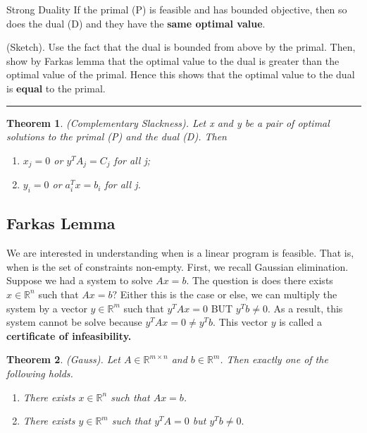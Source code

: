 \documentclass[twoside]{article}
\newcounter{lecnum}
\newtheorem{theorem}{Theorem}[lecnum]
\newenvironment{proof}{{\bf Proof:}}{\hfill\rule{2mm}{2mm}}
\begin{document}
\begin{theorem_exam}{Strong Duality}{} If the primal (P) is feasible and has bounded objective, then so does the dual (D) and they have the \textbf{same optimal value}.
\end{theorem_exam}

\begin{proof}(Sketch). Use the fact that the dual is bounded from above by the primal. Then, show by Farkas lemma that the optimal value to the dual is greater than the optimal value of the primal. Hence this shows that the optimal value to the dual is \textbf{equal} to the primal.
\end{proof}

\begin{theorem}(Complementary Slackness). Let x and y be a pair of optimal solutions to the primal (P) and the dual (D). Then 
\begin{enumerate}
    \item $x_j = 0$ or $y^TA_j = C_j$ for all j;
    \item $y_i = 0$ or $a_i^Tx = b_i$ for all j. 
\end{enumerate}
\end{theorem}

\subsection{Farkas Lemma}
We are interested in understanding when is a linear program is feasible. That is, when is the set of constraints non-empty. First, we recall Gaussian elimination. Suppose we had a system to solve $Ax = b$. The question is does there exists $x \in \mathbb{R}^n$ such that $Ax = b?$ Either this is the case or else, we can multiply the system by a vector $y \in \mathbb{R}^m$ such that $y^TAx = 0$ BUT $y^Tb \neq 0$. As a result, this system cannot be solve because $y^TAx = 0 \neq y^Tb.$ This vector $y$ is called a \textbf{certificate of infeasibility.}

\begin{theorem}(Gauss). Let $A \in \mathbb{R}^{m \times n}$ and $b \in \mathbb{R}^m$. Then exactly one of the following holds.
\begin{enumerate}
\item There exists $x \in \mathbb{R}^n$ such that $Ax = b$.
\item There exists $y \in \mathbb{R}^m$ such that $y^TA = 0$ but $y^Tb \neq 0.$
\end{enumerate}
\end{theorem}
\end{document}
